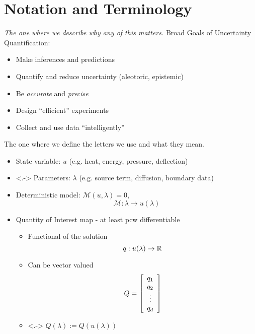 %


\section{Notation and Terminology}
\begin{frame}[t]{\it The one where we describe why any of this matters.}
\centering
	Broad Goals of Uncertainty Quantification:
	\vskip 10pt
    \begin{itemize}
	    \item Make inferences and predictions
	    \vskip 20pt
        \item Quantify and reduce uncertainty (aleotoric, epistemic)
	    \vskip 20pt
	    \item Be \emph{accurate} and \emph{precise}
	    \vskip 20pt
	    \item Design ``efficient'' experiments
	    \vskip 20pt
	    \item Collect and use data ``intelligently''
    \end{itemize}

\end{frame}

\begin{frame}[t]{The one where we define the letters we use and what they mean.}
\begin{itemize}
	\item State variable: $u$ {\color{gray}(e.g. heat, energy, pressure, deflection)}
	\vskip 10pt
	\item<.-> Parameters: $\lambda$ {\color{gray}(e.g. source term, diffusion, boundary data)}
	\vskip 10pt
		\item Deterministic model: $\mathcal{M} (u, \lambda) = 0$, $$\mathcal{M}:\lambda \to u(\lambda)$$

	\item Quantity of Interest map  - at least pcw differentiable \vskip 5pt
		\begin{itemize}
		\item Functional of the solution $$q: u(\lambda) \to \RR$$
		\item Can be vector valued $$Q = \mat{c}{q_1\\ q_2\\ \vdots \\ q_d}$$
		\item<.-> $Q(\lambda) := Q(u(\lambda))$
	\end{itemize}

\end{itemize}

\end{frame}


